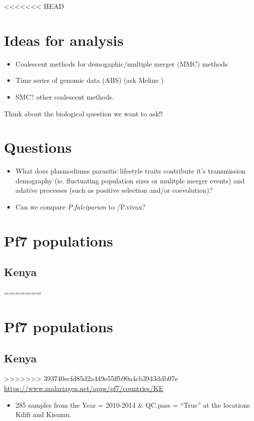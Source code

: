 \documentclass[11pt]{article}
\begin{document}
<<<<<<< HEAD
\section{Ideas for analysis}
\label{sec:orge4f9684}
\begin{itemize}
\item Coalescent methods for demogaphic/multiple merger (MMC) methods
\cite{korfmann-2023-simul-infer}

\item Time series of genomic data (ABS) (ask  Meline )
\item SMC? other coalescent methods.
\end{itemize}

Think about the biological question we want to ask!!

\section{Questions}
\label{sec:org8a3f90f}
\begin{itemize}
\item What does plasmodiums parasitic lifestyle traits contribute it's transmission demography (ie. fluctuating population sizes or mulitple merger events) and adative processes (such as  positive selection and/or coevolution)?
\item Can we compare \emph{P.falciparum} to /P.vivax?
\end{itemize}

\section{Pf7 populations}
\label{sec:orgf1379e4}
\subsection{Kenya}
\label{sec:org1888425}
=======
\section{Pf7 populations}
\label{sec:org2a47976}
\subsection{Kenya}
\label{sec:org99d87bc}
>>>>>>> 393740ecfd85d2a449e55ffb90a4cb3943ddb07e
\url{https://www.malariagen.net/apps/pf7/countries/KE}
\begin{itemize}
\item 285 samples from the Year = 2010-2014 \& QC.pass = ``True'' at the locations Kilifi and Kisumu.
\end{itemize}
\end{document}

